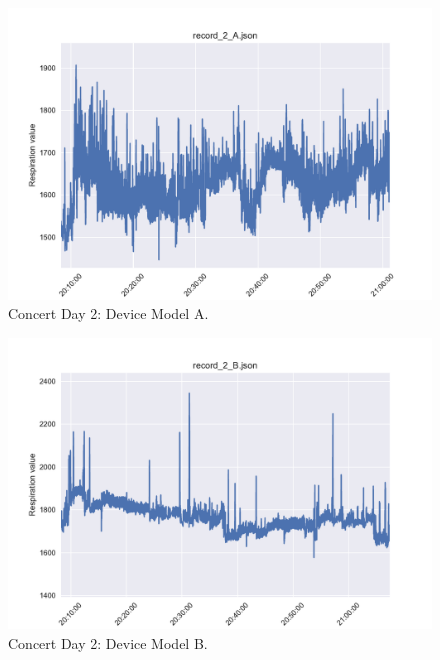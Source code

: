 \begin{figure}
    \centering
    \includegraphics[scale=0.6]{images/record_2_a.pdf}
    \caption{Concert Day 2: Device Model A.}
    \label{fig:concert_day2_a}
\end{figure}

\begin{figure}
    \centering
    \includegraphics[scale=0.6]{images/record_2_b.pdf}
    \caption{Concert Day 2: Device Model B.}
    \label{fig:concert_day2_b}
\end{figure}

